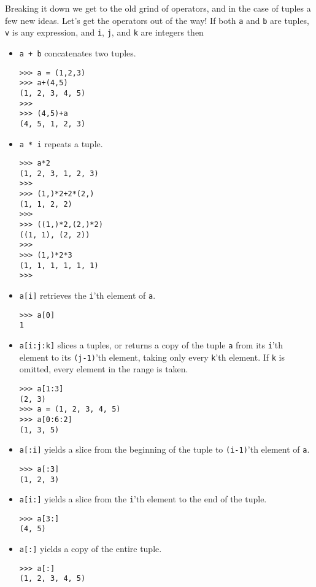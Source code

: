 Breaking it down we get to the old grind of operators, and in the   case of tuples a few new ideas. Let's get the operators out of the   way! If both \texttt{a} and \texttt{b} are tuples, \texttt{v} is any expression, and \texttt{i},   \texttt{j}, and \texttt{k} are integers then
\begin{itemize}
	\item 
\texttt{a + b} concatenates two tuples.
\begin{lstlisting}
>>> a = (1,2,3)
>>> a+(4,5)
(1, 2, 3, 4, 5)
>>>
>>> (4,5)+a
(4, 5, 1, 2, 3)
\end{lstlisting}
	\item 
\texttt{a * i} repeats a tuple.
\begin{lstlisting}
>>> a*2
(1, 2, 3, 1, 2, 3)
>>>
>>> (1,)*2+2*(2,)
(1, 1, 2, 2)
>>>
>>> ((1,)*2,(2,)*2)
((1, 1), (2, 2))
>>>
>>> (1,)*2*3
(1, 1, 1, 1, 1, 1)
>>>
\end{lstlisting}
	\item 
\texttt{a[i]} retrieves the \texttt{i}'th element of    \texttt{a}.
\begin{lstlisting}
>>> a[0]
1
\end{lstlisting}
	\item 
\texttt{a[i:j:k]} slices a tuples, or returns a copy of the tuple \texttt{a}    from its \texttt{i}'th element to its \texttt{(j-1)}'th element, taking only every    \texttt{k}'th element. If \texttt{k} is omitted, every element in the range is    taken.
\begin{lstlisting}
>>> a[1:3]
(2, 3)
>>> a = (1, 2, 3, 4, 5)
>>> a[0:6:2]
(1, 3, 5)
\end{lstlisting}
	\item 
\texttt{a[:i]} yields a slice from the beginning of the    tuple to \texttt{(i-1)}'th element of \texttt{a}.
\begin{lstlisting}
>>> a[:3]
(1, 2, 3)
\end{lstlisting}
	\item 
\texttt{a[i:]} yields a slice from the \texttt{i}'th element to the    end of the tuple.
\begin{lstlisting}
>>> a[3:]
(4, 5)
\end{lstlisting}
	\item 
\texttt{a[:]} yields a copy of the entire tuple.
\begin{lstlisting}
>>> a[:]
(1, 2, 3, 4, 5)
\end{lstlisting}
\end{itemize}

